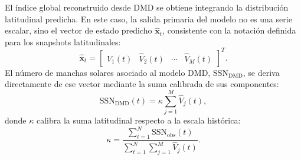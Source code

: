 El índice global reconstruido desde DMD se obtiene integrando la distribución latitudinal predicha. En este caso, la salida primaria del modelo no es una serie escalar, sino el vector de estado predicho $\widehat{\mathbf{x}}_t$, consistente con la notación definida para los snapshots latitudinales:
\begin{equation}
\widehat{\mathbf{x}}_t=\begin{bmatrix}
\widehat{V}_1(t) & \widehat{V}_2(t) & \cdots & \widehat{V}_M(t)
\end{bmatrix}^{T}.
\end{equation}
El número de manchas solares asociado al modelo DMD, $\mathrm{SSN}_{\mathrm{DMD}}$, se deriva directamente de ese vector mediante la suma calibrada de sus componentes:
\begin{equation}
\mathrm{SSN}_{\mathrm{DMD}}(t)=\kappa\sum_{j=1}^{M}\widehat{V}_j(t),
\end{equation}
donde $\kappa$ calibra la suma latitudinal respecto a la escala histórica:
\begin{equation}
\kappa=\frac{\sum_{t=1}^{N}\mathrm{SSN}_{\mathrm{obs}}(t)}{\sum_{t=1}^{N}\sum_{j=1}^{M}\widehat{V}_j(t)}.
\end{equation}
